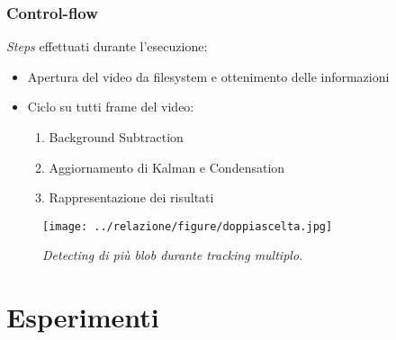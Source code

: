 \documentclass{beamer}
\begin{document}
\begin{frame}[fragile]
\frametitle{Control-flow}

\textit{Steps} effettuati durante l'esecuzione:

\begin{itemize}
\item Apertura del video da filesystem e ottenimento delle informazioni
\item Ciclo su tutti frame del video:
	\begin{enumerate}
	\item Background Subtraction
	\item Aggiornamento di Kalman e Condensation
	\item Rappresentazione dei risultati 
	\end{enumerate}
\end{itemize}

\begin{figure}[hb]
\centering
	\texttt{[image: ../relazione/figure/doppiascelta.jpg]}
\caption[Esempio di scelta tra due blob]{\textit{Detecting di più blob durante tracking multiplo.}\label{fig:scelta2blob}}
\end{figure}


%	
%		
%			
%	
%			



\end{frame}
\section{Esperimenti}
\end{document}
